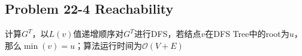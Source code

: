 \subsection*{Problem 22-4 Reachability}
计算$G^T$，以$L(v)$值递增顺序对$G^T$进行DFS，若结点$v$在DFS Tree中的root为$u$，那么$\min(v) = u$；算法运行时间为$\mathcal{O}(V + E)$

